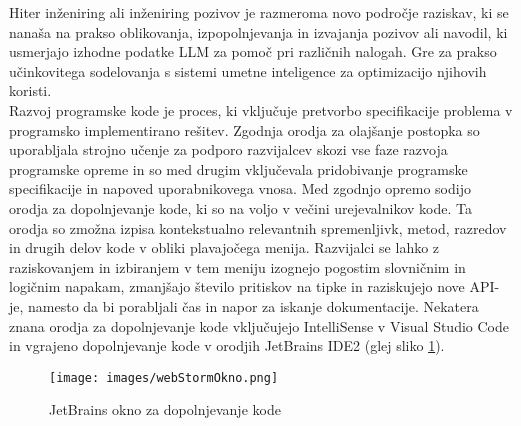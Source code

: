 \documentclass[a4paper,12pt,openright]{book}
\begin{document}
Hiter inženiring ali inženiring pozivov je razmeroma novo področje raziskav, ki se nanaša na prakso oblikovanja, izpopolnjevanja in izvajanja pozivov ali navodil, ki usmerjajo izhodne podatke LLM za pomoč pri različnih nalogah. Gre za prakso učinkovitega sodelovanja s sistemi umetne inteligence za optimizacijo njihovih koristi. \cite{info:doi/10.2196/50638} \\
Razvoj programske kode je proces, ki vključuje pretvorbo specifikacije problema v programsko implementirano rešitev. Zgodnja orodja za olajšanje postopka so uporabljala strojno učenje za podporo razvijalcev skozi vse faze razvoja programske opreme in so med drugim vključevala pridobivanje programske specifikacije in napoved uporabnikovega vnosa.
Med zgodnjo opremo sodijo orodja za dopolnjevanje kode, ki so na voljo v večini urejevalnikov kode. Ta orodja so zmožna izpisa kontekstualno relevantnih spremenljivk, metod, razredov in drugih delov kode v obliki plavajočega menija. Razvijalci se lahko z raziskovanjem in izbiranjem v tem meniju izognejo pogostim slovničnim in logičnim napakam, zmanjšajo število pritiskov na tipke in raziskujejo nove API-je, namesto da bi porabljali čas in napor za iskanje dokumentacije. Nekatera znana orodja za dopolnjevanje kode vključujejo IntelliSense v Visual Studio Code in vgrajeno dopolnjevanje kode v orodjih JetBrains IDE2 (glej sliko \ref{fig:jetBrainsOkno}). \cite{hu2019re} \\
\begin{figure}[H]
    \centering
    \texttt{[image: images/webStormOkno.png]}
    \caption{JetBrains okno za dopolnjevanje kode}
    \label{fig:jetBrainsOkno}
\end{figure}
\end{document}
